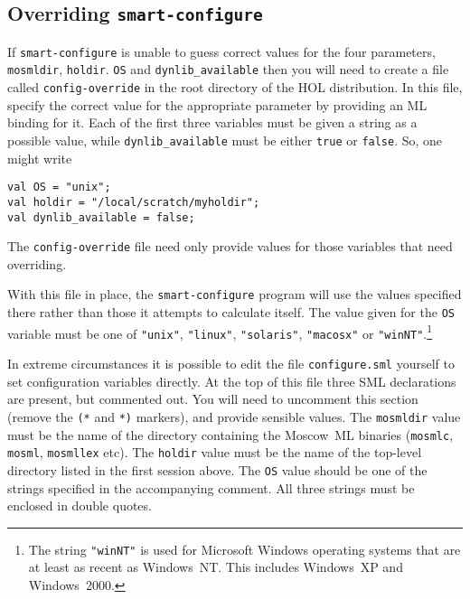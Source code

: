 \subsection{Overriding \texttt{smart-configure}}
\label{sec:editting-configure}

If \texttt{smart-configure} is unable to guess correct values for the
four parameters, \texttt{mosmldir}, \texttt{holdir}. \texttt{OS} and
\texttt{dynlib\_available} then you will need to create a file called
\texttt{config-override} in the root directory of the HOL
distribution.  In this file, specify the correct value for the
appropriate parameter by providing an ML binding for it.  Each of the
first three variables must be given a string as a possible value,
while \texttt{dynlib\_available} must be either \texttt{true} or
\texttt{false}.  So, one might write

\begin{session}
\begin{verbatim}
val OS = "unix";
val holdir = "/local/scratch/myholdir";
val dynlib_available = false;
\end{verbatim}
\end{session}

The \texttt{config-override} file need only provide values for those
variables that need overriding.

With this file in place, the \texttt{smart-configure} program will use
the values specified there rather than those it attempts to calculate
itself.  The value given for the \texttt{OS} variable must be one of
\texttt{"unix"}, \texttt{"linux"}, \texttt{"solaris"},
\texttt{"macosx"} or \texttt{"winNT"}.\footnote{The string
  \texttt{"winNT"} is used for Microsoft Windows operating systems
  that are at least as recent as Windows~NT.  This includes Windows~XP
  and Windows~2000.}

In extreme circumstances it is possible to edit the file
\texttt{configure.sml} yourself to set configuration variables
directly.  At the top of this file three SML declarations are present,
but commented out.  You will need to uncomment this section (remove
the \texttt{(*} and \texttt{*)} markers), and provide sensible values.
The \texttt{mosmldir} value must be the name of the directory
containing the Moscow~ML binaries (\texttt{mosmlc}, \texttt{mosml},
\texttt{mosmllex} etc).  The \texttt{holdir} value must be the name of
the top-level directory listed in the first session above.  The
\texttt{OS} value should be one of the strings specified in the
accompanying comment.  All three strings must be enclosed in double
quotes.

